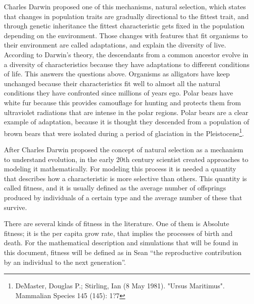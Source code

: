 Charles Darwin proposed one of this mechanisms, natural selection, which states  that changes in population traits are gradually directional to the fittest trait, and through genetic inheritance the fittest characteristic gets fixed in the population depending on the environment. Those changes with features that fit organisms to their environment are called adaptations, and explain the diversity of live\cite{Douglas}. According to Darwin's theory, the descendants from a common ancestor evolve in a diversity of characteristics because they have adaptations to different conditions of life. This answers the questions above. Organisms as alligators have  keep unchanged because their characteristics fit well to almost all the natural conditions they have confronted since millions of years ego. Polar bears have white fur because this provides camouflage for hunting and protects them from ultraviolet radiations that are intense in the polar regions. Polar bears are a clear example of adaptation, because it is thought they descended from a population of brown bears that were isolated during a period of glaciation in the Pleistocene\footnote{DeMaster, Douglas P.; Stirling, Ian (8 May 1981). "Ursus Maritimus". Mammalian Species 145 (145): 1?7}.        

After Charles Darwin proposed the concept of natural selection as a mechanism to understand  evolution, in the early 20th century scientist created  approaches to modeling it mathematically. For modeling this process it is needed a quantity that describes how a characteristic is more selective than others. This quantity is called fitness, and it is usually defined as the average number of offsprings produced by individuals of a certain type and the average number of these that survive\cite{Sean}.

There are several kinds of fitness in the literature. One of them is Absolute fitness; it is the per capita grow rate, that implies the processes of birth and death. For the mathematical description and simulations that will be found in this document, fitness will be defined as in Sean\cite{Sean} ``the reproductive contribution by an individual to the next generation''.  





